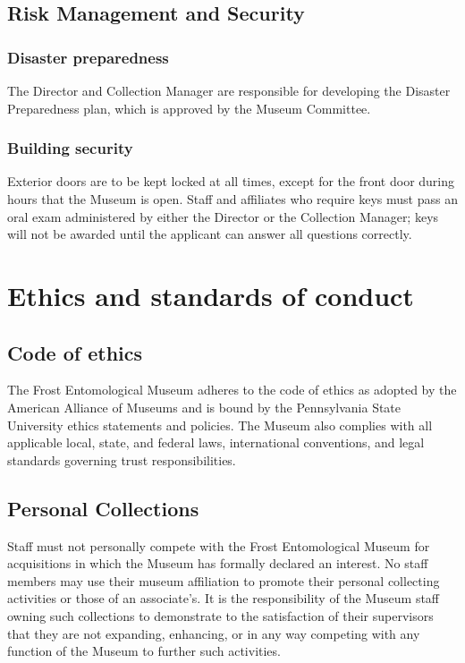 \documentclass[letterpaper, 11pt]{article}
\begin{document}
\subsection{Risk Management and Security}
\subsubsection{Disaster preparedness}
The Director and Collection Manager are responsible for developing the Disaster Preparedness plan, which is approved by the Museum Committee.
\subsubsection{Building security}
Exterior doors are to be kept locked at all times, except for the front door during hours that the Museum is open. Staff and affiliates who require keys must pass an oral exam administered by either the Director or the Collection Manager; keys will not be awarded until the applicant can answer all questions correctly.

\clearpage
\section{Ethics and standards of conduct}
\subsection{Code of ethics}
The Frost Entomological Museum adheres to the code of ethics as adopted by the American Alliance of Museums\citep{AAMethics} and is bound by the Pennsylvania State University ethics statements and policies\citep{PSUethics}. The Museum also complies with all applicable local, state, and federal laws, international conventions, and legal standards governing trust responsibilities. 

\subsection{Personal Collections}
Staff must not personally compete with the Frost Entomological Museum for acquisitions in which the Museum has formally declared an interest. No staff members may use their museum affiliation to promote their personal collecting activities or those of an associate's. It is the responsibility of the Museum staff owning such collections to demonstrate to the satisfaction of their supervisors that they are not expanding, enhancing, or in any way competing with any function of the Museum to further such activities.\\
\end{document}
